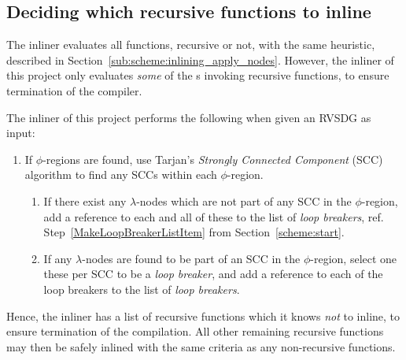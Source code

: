 \subsection{Deciding which recursive functions to inline}
\label{sub:scheme:inlining_recur_apply_nodes}

The inliner evaluates all functions, recursive or not, with the same heuristic,
described in Section~\ref{sub:scheme:inlining_apply_nodes}. However, the inliner
of this project only evaluates \textit{some} of the \applyNode s invoking
recursive functions, to ensure termination of the compiler.


The inliner of this project performs the following when given an RVSDG as input:

\begin{enumerate}
	\item If $\phi$-regions are found, use Tarjan's \textit{Strongly Connected
Component} (SCC) algorithm\cite{doi:10.1137/0205051} to find any SCCs within
each $\phi$-region.

	\begin{enumerate}
	\item If there exist any $\lambda$-nodes which are not part of any SCC in
the $\phi$-region, add a reference to each and all of these to the list of
\textit{loop breakers}, ref. Step~\ref{MakeLoopBreakerListItem} from
Section~\ref{scheme:start}.

	\item If any $\lambda$-nodes are found to be part of an SCC in the
$\phi$-region, select one these per SCC to be
a \textit{loop breaker}, and add a reference to each of the loop breakers to the
list of \textit{loop breakers}.
	\end{enumerate}
\end{enumerate}

Hence, the inliner has a list of recursive functions which it knows \textit{not}
to inline, to ensure termination of the compilation. All other remaining
recursive functions may then be safely inlined with the same criteria as any
non-recursive functions.
